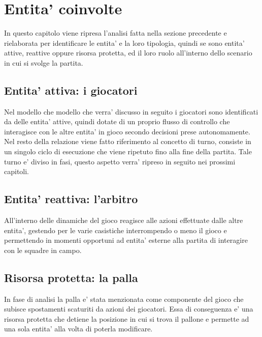 \section*{Entita' coinvolte}%

In questo capitolo viene ripresa l’analisi fatta nella sezione precedente e rielaborata per identificare le entita’ e la loro tipologia, quindi se sono entita’ attive, reattive oppure risorsa protetta, ed il loro ruolo all’interno dello scenario in cui si svolge la partita. 

\subsection*{Entita’ attiva: i giocatori}
%
\label{sec:entita_giocatori}

Nel modello che modello che verra’ discusso in seguito i giocatori sono identificati da delle entita’ attive, quindi dotate di un proprio flusso di controllo che interagisce con le altre entita’ in gioco secondo decisioni prese autonomamente. Nel resto della relazione viene fatto riferimento al concetto di turno, consiste in un singolo ciclo di esecuzione che viene ripetuto fino alla fine della partita. Tale turno e’ diviso in fasi, questo aspetto verra’ ripreso in seguito nei prossimi capitoli.

\subsection*{Entita’ reattiva: l'arbitro}
%
\label{sec:entita_abitro}

All’interno delle dinamiche del gioco reagisce alle azioni effettuate dalle altre entita’, gestendo per le varie casistiche interrompendo o meno il gioco e permettendo in momenti opportuni ad entita’ esterne alla partita di interagire con le squadre in campo.

\subsection*{Risorsa protetta: la palla}
%
\label{sec:entita_palla}

In fase di analisi la palla e’ stata menzionata come componente del gioco che subisce spostamenti scaturiti da azioni dei giocatori. Essa di conseguenza e’ una risorsa protetta che detiene la posizione in cui si trova il pallone e permette ad una sola entita’ alla volta di poterla modificare.

